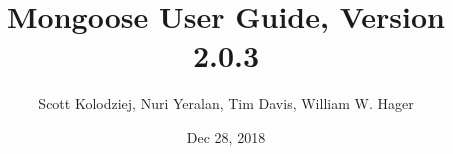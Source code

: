 \title{Mongoose User Guide, Version 2.0.3}
\author{Scott Kolodziej, Nuri Yeralan, Tim Davis, William W. Hager}
\date{Dec 28, 2018}
